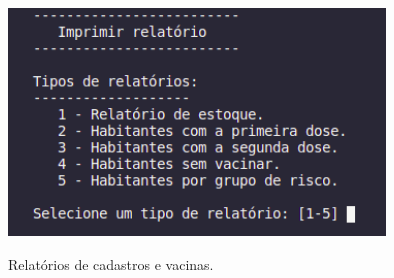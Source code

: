\documentclass[12pt, a4paper]{article}
\begin{document}
\begin{figure}[!h]
	\caption{Relatórios de cadastros e vacinas.}
	
	\centering %
	\includegraphics[width=10cm]{imprimirRelatorio.png} %
	\label{relatorio}
\end{figure}
\end{document}
